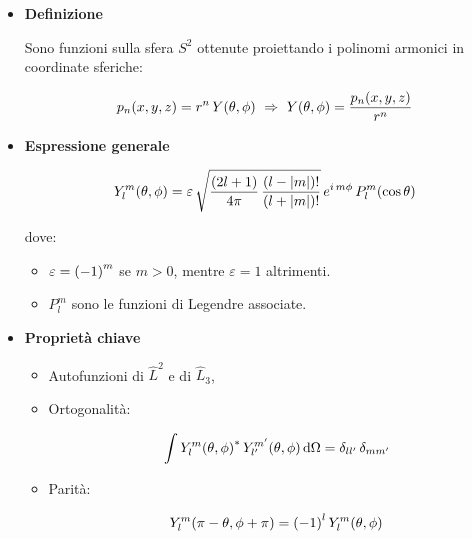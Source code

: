 \begin{myriass}
	
\begin{itemize}
	\item \textbf{Definizione}
		
		Sono funzioni sulla sfera $S^2$ ottenute proiettando i polinomi armonici in coordinate sferiche:
		
	\begin{align*}
		p_n\qty(x, y, z) = r^n \, Y\qty(\theta, \phi) \, \, \Rightarrow \, \, Y\qty(\theta, \phi) = \frac{p_n\qty(x, y, z)}{r^n}
	\end{align*}

		
	\item \textbf{Espressione generale}
	
	\begin{align*}
		Y_l^m \qty(\theta, \phi) =  \varepsilon \, \sqrt{\frac{\qty(2l +1 )}{4	\pi} \, \frac{\qty(l -|m|)!}{\qty(l + |m|)!}} \, e^{i \, m\phi} \, P_l^m\qty(\cos\theta)
	\end{align*}

		dove:
		
	\begin{itemize}	
		\item $\varepsilon = \qty(-1)^m$ se $m > 0$, mentre $\varepsilon = 1$ altrimenti. 
		\item $P_l^m$ sono le funzioni di Legendre associate.
	\end{itemize}

	\item \textbf{Proprietà chiave}
	
	\begin{itemize}
		\item Autofunzioni di $\hat{L}^2$ e di $\hat{L}_3$,
		
		\item Ortogonalità:
		
		\begin{align*}
			\int Y_l^m \qty(\theta, \phi)^* \, Y_{l'}^{m'}\qty(\theta, \phi) \, \dd \Omega = \delta_{ll'} \, \delta_{mm'} 
		\end{align*}

		\item Parità:
		
		\begin{align*}
			Y_l^m\qty(\pi - \theta,  \phi + \pi) = \qty(-1)^l \, Y_l^m\qty(\theta, \phi)
		\end{align*}

	\end{itemize}
	
	
\end{itemize}

\end{myriass}

